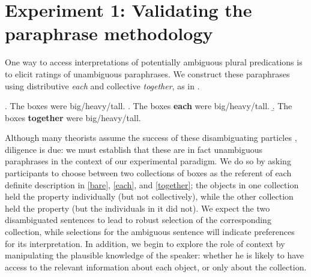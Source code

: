 \documentclass[linguex]{sp}
\begin{document}
%

\section{Experiment 1: Validating the paraphrase methodology}

One way to access interpretations of potentially ambiguous plural predications is to elicit ratings of unambiguous paraphrases. We construct these paraphrases using distributive \emph{each} and collective \emph{together}, as in \Next.

\ex. \label{bare}The boxes were big/heavy/tall.
\a.\label{each} The boxes \textbf{each} were big/heavy/tall.
\b.\label{together} The boxes \textbf{together} were big/heavy/tall.

Although many theorists assume the success of these disambiguating particles \citep[e.g.,][]{schwarzschild1994}, diligence is due: we must establish that these are in fact unambiguous paraphrases in the context of our experimental paradigm. We do so by asking participants to choose between two collections of boxes as the referent of each definite description in \ref{bare}, \ref{each}, and \ref{together}; the objects in one collection held the property individually (but not collectively), while the other collection held the property (but the individuals in it did not).
We expect the two disambiguated sentences to lead to robust selection of the corresponding collection, while selections for the ambiguous sentence will indicate preferences for its interpretation.
In addition, we begin to explore the role of context by manipulating the plausible knowledge of the speaker: whether he is likely to have access to the relevant information about each object, or only about the collection.
\end{document}
